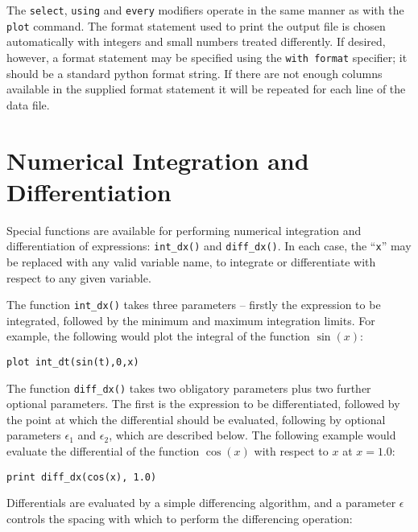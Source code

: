 \noindent The {\tt select}, {\tt using} and {\tt every} modifiers operate in the
same manner as with the {\tt plot} command.  The format statement used to print
the output file is chosen automatically with integers and small numbers treated
differently.  If desired, however, a format statement may be specified using the
{\tt with format} specifier; it should be a standard python format string.  If
there are not enough columns available in the supplied format statement it will
be repeated for each line of the data file.

\section{Numerical Integration and Differentiation}

Special functions are available for performing numerical integration and
differentiation of expressions: \texttt{int\_dx()} and
\texttt{diff\_dx()}. In each case, the ``\texttt{x}'' may be
replaced with any valid variable name, to integrate or differentiate with
respect to any given variable.

The function \texttt{int\_dx()} takes three parameters -- firstly the
expression to be integrated, followed by the minimum and maximum integration
limits. For example, the following would plot the integral of the function
$\sin(x)$:

\begin{verbatim}
plot int_dt(sin(t),0,x)
\end{verbatim} 

The function \texttt{diff\_dx()} takes two obligatory parameters plus two
further optional parameters. The first is the expression to be differentiated,
followed by the point at which the differential should be evaluated, following
by optional parameters $\epsilon_1$ and $\epsilon_2$, which are described
below.  The following example would evaluate the differential of the function
$\cos(x)$ with respect to $x$ at $x=1.0$:

\begin{verbatim}
print diff_dx(cos(x), 1.0)
\end{verbatim}

Differentials are evaluated by a simple differencing algorithm, and a parameter
$\epsilon$ controls the spacing with which to perform the differencing
operation:

